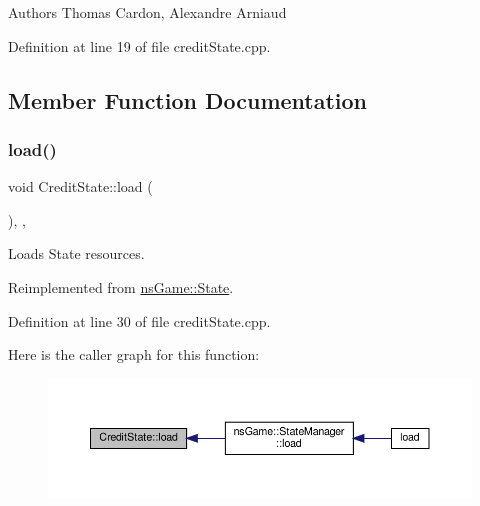 \begin{DoxyAuthor}{Authors}
Thomas Cardon, Alexandre Arniaud 
\end{DoxyAuthor}


Definition at line 19 of file credit\+State.\+cpp.



\subsection{Member Function Documentation}
\mbox{\label{class_credit_state_a32ec8ae5c12ee636cfd2b949b8e980e1}} 
\subsubsection{\texorpdfstring{load()}{load()}}
{\footnotesize\ttfamily void Credit\+State\+::load (\begin{DoxyParamCaption}{ }\end{DoxyParamCaption})\hspace{0.3cm}{\ttfamily [inline]}, {\ttfamily [override]}, {\ttfamily [virtual]}}



Loads State resources. 



Reimplemented from \hyperlink{structns_game_1_1_state_a8644de505f7a84933f6d6e6651205791}{ns\+Game\+::\+State}.



Definition at line 30 of file credit\+State.\+cpp.

Here is the caller graph for this function\+:\nopagebreak
\begin{figure}[H]
\begin{center}
\leavevmode
\includegraphics[width=350pt]{class_credit_state_a32ec8ae5c12ee636cfd2b949b8e980e1_icgraph}
\end{center}
\end{figure}
\mbox{\label{class_credit_state_aa4ba316fca29d0e79ee70891e373a060}} 
